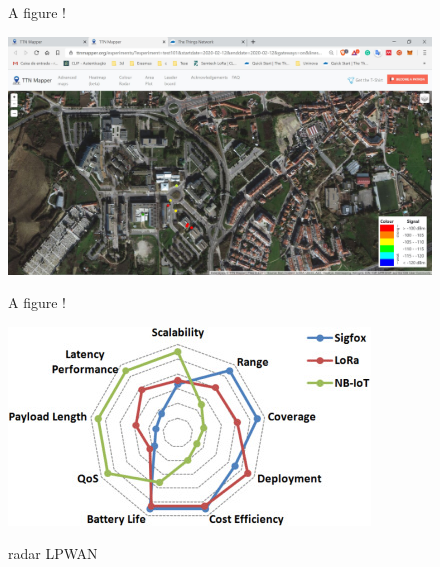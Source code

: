 \begin{figure}[htbp]
  \centering
  \caption{A figure !}
  \label{fig:node_red_debug1}
\end{figure}
\newpage
\begin{figure}[htbp]
  \centering
  
    {\includegraphics[width=0.5\linewidth]{Chapters/Figures/ttnmapper.JPG}}%
 
  \caption{A figure !}
  \label{fig:ttn_mapper}
\end{figure}



\begin{figure}[htbp]
  \centering
  
    {\includegraphics[width=0.5\linewidth]{Chapters/Figures/radar1.jpg}}%
 
  \caption{radar LPWAN}
  \label{fig:radar1}
\end{figure}



